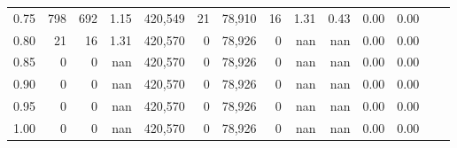 \begin{tabular}{rrrrrrrrrrrrrr}
0.75 &     798 &     692 &    1.15 &  420,549 &       21 &  78,910 &      16 &  1.31 &  0.43 &  0.00 &      0.00 \\
0.80 &      21 &      16 &    1.31 &  420,570 &        0 &  78,926 &       0 &   nan &   nan &  0.00 &      0.00 \\
0.85 &       0 &       0 &     nan &  420,570 &        0 &  78,926 &       0 &   nan &   nan &  0.00 &      0.00 \\
0.90 &       0 &       0 &     nan &  420,570 &        0 &  78,926 &       0 &   nan &   nan &  0.00 &      0.00 \\
0.95 &       0 &       0 &     nan &  420,570 &        0 &  78,926 &       0 &   nan &   nan &  0.00 &      0.00 \\
1.00 &       0 &       0 &     nan &  420,570 &        0 &  78,926 &       0 &   nan &   nan &  0.00 &      0.00 \\
\bottomrule
\end{tabular}
